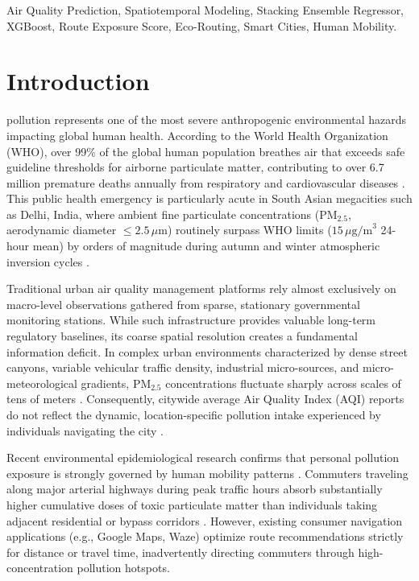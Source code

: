 \documentclass[journal]{IEEEtran}
\begin{document}
\begin{IEEEkeywords}
Air Quality Prediction, Spatiotemporal Modeling, Stacking Ensemble Regressor, XGBoost, Route Exposure Score, Eco-Routing, Smart Cities, Human Mobility.
\end{IEEEkeywords}

\IEEEpeerreviewmaketitle

\section{Introduction}
 pollution represents one of the most severe anthropogenic environmental hazards impacting global human health. According to the World Health Organization (WHO), over 99\% of the global human population breathes air that exceeds safe guideline thresholds for airborne particulate matter, contributing to over 6.7 million premature deaths annually from respiratory and cardiovascular diseases \cite{who2021}. This public health emergency is particularly acute in South Asian megacities such as Delhi, India, where ambient fine particulate concentrations ($\text{PM}_{2.5}$, aerodynamic diameter $\le 2.5\,\mu\text{m}$) routinely surpass WHO limits ($15\,\mu\text{g/m}^3$ 24-hour mean) by orders of magnitude during autumn and winter atmospheric inversion cycles \cite{agrawal2020}.

Traditional urban air quality management platforms rely almost exclusively on macro-level observations gathered from sparse, stationary governmental monitoring stations. While such infrastructure provides valuable long-term regulatory baselines, its coarse spatial resolution creates a fundamental information deficit. In complex urban environments characterized by dense street canyons, variable vehicular traffic density, industrial micro-sources, and micro-meteorological gradients, $\text{PM}_{2.5}$ concentrations fluctuate sharply across scales of tens of meters \cite{keerthirathna2021}. Consequently, citywide average Air Quality Index (AQI) reports do not reflect the dynamic, location-specific pollution intake experienced by individuals navigating the city \cite{denazelle2013}.

Recent environmental epidemiological research confirms that personal pollution exposure is strongly governed by human mobility patterns \cite{chen2019}. Commuters traveling along major arterial highways during peak traffic hours absorb substantially higher cumulative doses of toxic particulate matter than individuals taking adjacent residential or bypass corridors \cite{nguyen2020}. However, existing consumer navigation applications (e.g., Google Maps, Waze) optimize route recommendations strictly for distance or travel time, inadvertently directing commuters through high-concentration pollution hotspots.
\end{document}
